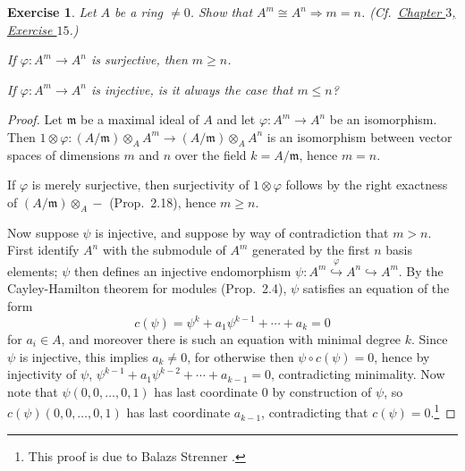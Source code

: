 \documentclass[12pt,letterpaper]{article}
\newtheorem{problem}{Exercise}[section]
\theoremstyle{definition}
\theoremstyle{remark}
\numberwithin{figure}{problem}
\numberwithin{equation}{section}
\begin{document}
\begin{problem}
  Let
  $A$ be a ring
  $\ne
  0$.
  Show that
  $A^m \cong A^n \Rightarrow m =
  n$.
  (Cf.~\href{AM 3 Rings and Modules of Fractions.pdf#exc:3.15}{Chapter
    $3$, Exercise
    $15$}.) \par If
  $\varphi\colon A^m \to
  A^n$ is surjective, then
  $m \ge
  n$.
  \par If
  $\varphi\colon A^m \to
  A^n$ is injective, is it always the case that
  $m \le
  n$?
\end{problem}
\begin{proof}
  Let
  $\mathfrak{m}$ be a maximal ideal of
  $A$ and let
  $\varphi\colon A^m \to
  A^n$ be an isomorphism.
  Then
  $1 \otimes \varphi\colon (A/\mathfrak{m}) \otimes_A A^m \to (A/\mathfrak{m}) \otimes_A
  A^n$ is an isomorphism between vector spaces of dimensions
  $m$ and
  $n$ over the field
  $k =
  A/\mathfrak{m}$, hence
  $m=n$.
  \par If
  $\varphi$ is merely surjective, then surjectivity of
  $1 \otimes
  \varphi$ follows by the right exactness of
  $(A/\mathfrak{m}) \otimes_A
  -$ (Prop.~2.18), hence
  $m \ge
  n$.
  \par Now suppose
  $\psi$ is injective, and suppose by way of contradiction that
  $m >
  n$.
  First identify
  $A^n$ with the submodule of
  $A^m$ generated by the first
  $n$ basis elements;
  $\psi$ then defines an injective endomorphism
  $\psi \colon A^m \overset{\varphi}{\hookrightarrow} A^n \hookrightarrow
  A^m$.
  By the Cayley-Hamilton theorem for modules (Prop.~2.4),
  $\psi$ satisfies an equation of the form
  \begin{equation*}
    c(\psi) = \psi^k + a_{1}\psi^{k-1} + \cdots + a_k = 0
  \end{equation*}
  for
  $a_i \in
  A$, and moreover there is such an equation with minimal degree
  $k$.
  Since
  $\psi$ is injective, this implies
  $a_k \ne
  0$, for otherwise then
  $\psi \circ c(\psi) =
  0$, hence by injectivity of
  $\psi$,
  $\psi^{k-1} + a_{1}\psi^{k-2} + \cdots + a_{k-1} =
  0$, contradicting minimality.
  Now note that
  $\psi(0,0,\ldots,0,1)$ has last coordinate
  $0$ by construction of
  $\psi$, so
  $c(\psi)(0,0,\ldots,0,1)$ has last coordinate
  $a_{k-1}$, contradicting that
  $c(\psi) =
  0$.\footnote{This proof is due to Balazs Strenner \cite{MO47846}.}
\end{proof}
\end{document}
